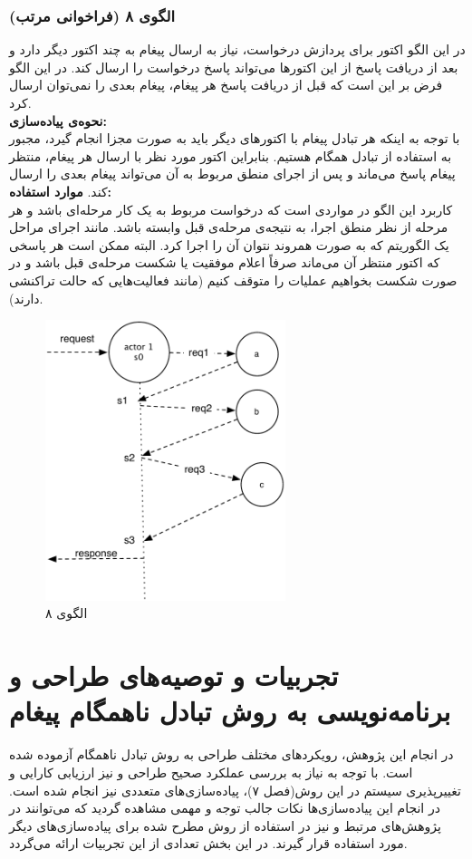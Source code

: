 \subsubsection{الگوی ۸ (فراخوانی مرتب)}
در این الگو اکتور برای پردازش درخواست، نیاز به ارسال پیغام به چند اکتور دیگر دارد و بعد از دریافت پاسخ از این اکتورها می‌تواند پاسخ درخواست را ارسال کند. در این الگو فرض بر این است که قبل از دریافت پاسخ هر پیغام، پیغام بعدی را نمی‌توان ارسال کرد.\\
\textbf{نحوه‌ی پیاده‌سازی:}\\
با توجه به اینکه هر تبادل پیغام با اکتورهای دیگر باید به صورت مجزا انجام گیرد، مجبور به استفاده از تبادل همگام هستیم. بنابراین اکتور مورد نظر با ارسال هر پیغام، منتظر پیغام پاسخ می‌ماند و پس از اجرای منطق مربوط به آن می‌تواند پیغام بعدی را ارسال کند.
\textbf{موارد استفاده:}\\
 کاربرد این الگو در مواردی است که درخواست مربوط به یک کار مرحله‌ای باشد و هر مرحله از نظر منطق اجرا، به نتیجه‌ی مرحله‌ی قبل وابسته باشد. مانند اجرای مراحل یک الگوریتم که به صورت همروند نتوان آن را اجرا کرد. البته ممکن است هر پاسخی که اکتور منتظر آن می‌ماند صرفاً اعلام موفقیت یا شکست مرحله‌ی قبل باشد و در صورت شکست بخواهیم عملیات را متوقف کنیم (مانند فعالیت‌هایی که حالت تراکنشی دارند).
\begin{figure}[ht]
    \begin{center}
	\includegraphics[width=7cm]{4-ProposedFramework/Figures/Patterns_statelfull_rpc.pdf}
    \end{center}
    \caption{\label{fig:Patterns_statefull_8}الگوی ۸}
\end{figure}

\section{ تجربیات و توصیه‌های طراحی و برنامه‌نویسی به روش تبادل ناهمگام پیغام}
در انجام این پژوهش، رویکردهای مختلف طراحی به روش تبادل ناهمگام آزموده شده است. با توجه به نیاز به بررسی عملکرد صحیح طراحی و نیز ارزیابی کارایی و تغییرپذیری سیستم در این روش(فصل ۷)، پیاده‌سازی‌های متعددی نیز انجام شده است. در انجام این پیاده‌سازی‌ها نکات جالب توجه و مهمی مشاهده گردید که می‌توانند در پژوهش‌های مرتبط و نیز در استفاده از روش مطرح شده برای پیاده‌سازی‌های دیگر مورد استفاده قرار گیرند. در این بخش تعدادی از این تجربیات ارائه می‌گردد.

